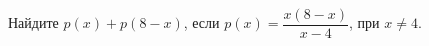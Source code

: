 \begin{ex}
	\begin{condition}
		Найдите \( p(x)+p(8-x) \), если \( p(x)=\dfrac{x(8-x)}{x-4} \), при \( x\neq4 \).
	\end{condition}
\end{ex}